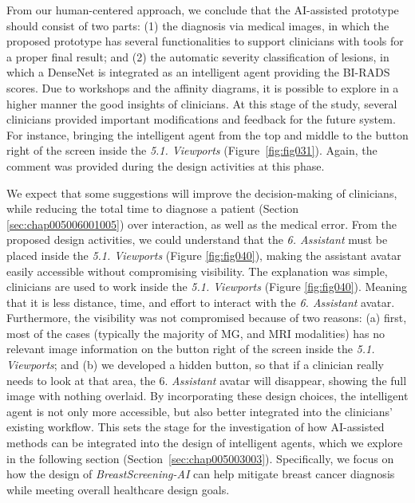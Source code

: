 From our human-centered approach, we conclude that the \ac{AI}-assisted prototype should consist of two parts:
(1) the diagnosis via medical images, in which the proposed prototype has several functionalities to support clinicians with tools for a proper final result; and
(2) the automatic severity classification of lesions, in which a DenseNet is integrated as an intelligent agent providing the \ac{BI-RADS} scores.
Due to workshops and the affinity diagrams, it is possible to explore in a higher manner the good insights of clinicians.
At this stage of the study, several clinicians provided important modifications and feedback for the future system.
For instance, bringing the intelligent agent from the top and middle to the button right of the screen inside the {\it 5.1. Viewports} (Figure~\ref{fig:fig031}).
Again, the comment was provided during the design activities at this phase.

We expect that some suggestions will improve the decision-making of clinicians, while reducing the total time to diagnose a patient (Section \ref{sec:chap005006001005}) over interaction, as well as the medical error.
From the proposed design activities, we could understand that the {\it 6. Assistant} must be placed inside the {\it 5.1. Viewports} (Figure \ref{fig:fig040}), making the assistant avatar easily accessible without compromising visibility.
The explanation was simple, clinicians are used to work inside the {\it 5.1. Viewports} (Figure \ref{fig:fig040}).
Meaning that it is less distance, time, and effort to interact with the {\it 6. Assistant} avatar.
Furthermore, the visibility was not compromised because of two reasons:
(a) first, most of the cases (typically the majority of \ac{MG}, and \ac{MRI} modalities) has no relevant image information on the button right of the screen inside the {\it 5.1. Viewports}; and
(b) we developed a hidden button, so that if a clinician really needs to look at that area, the {6. \it Assistant} avatar will disappear, showing the full image with nothing overlaid.
By incorporating these design choices, the intelligent agent is not only more accessible, but also better integrated into the clinicians' existing workflow.
This sets the stage for the investigation of how \ac{AI}-assisted methods can be integrated into the design of intelligent agents, which we explore in the following section (Section~\ref{sec:chap005003003}).
Specifically, we focus on how the design of {\it BreastScreening-AI} can help mitigate breast cancer diagnosis while meeting overall healthcare design goals.

